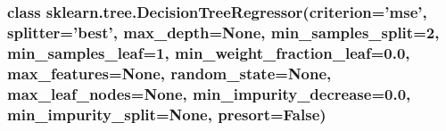 \documentclass[11pt]{article}
\begin{document}
    \hypertarget{class-sklearn.tree.decisiontreeregressorcriterionmse-splitterbest-max_depthnone-min_samples_split2-min_samples_leaf1-min_weight_fraction_leaf0.0-max_featuresnone-random_statenone-max_leaf_nodesnone-min_impurity_decrease0.0-min_impurity_splitnone-presortfalse}{%
\subsubsection{\texorpdfstring{class
sklearn.tree.DecisionTreeRegressor(criterion='mse', splitter='best',
max\_depth=None, min\_samples\_split=2, min\_samples\_leaf=1,
min\_weight\_fraction\_leaf=0.0, max\_features=None, random\_state=None,
max\_leaf\_nodes=None, min\_impurity\_decrease=0.0,
min\_impurity\_split=None, presort=False)
}{class sklearn.tree.DecisionTreeRegressor(criterion='mse', splitter='best', max\_depth=None, min\_samples\_split=2, min\_samples\_leaf=1, min\_weight\_fraction\_leaf=0.0, max\_features=None, random\_state=None, max\_leaf\_nodes=None, min\_impurity\_decrease=0.0, min\_impurity\_split=None, presort=False)  }}\label{class-sklearn.tree.decisiontreeregressorcriterionmse-splitterbest-max_depthnone-min_samples_split2-min_samples_leaf1-min_weight_fraction_leaf0.0-max_featuresnone-random_statenone-max_leaf_nodesnone-min_impurity_decrease0.0-min_impurity_splitnone-presortfalse}}
\end{document}
